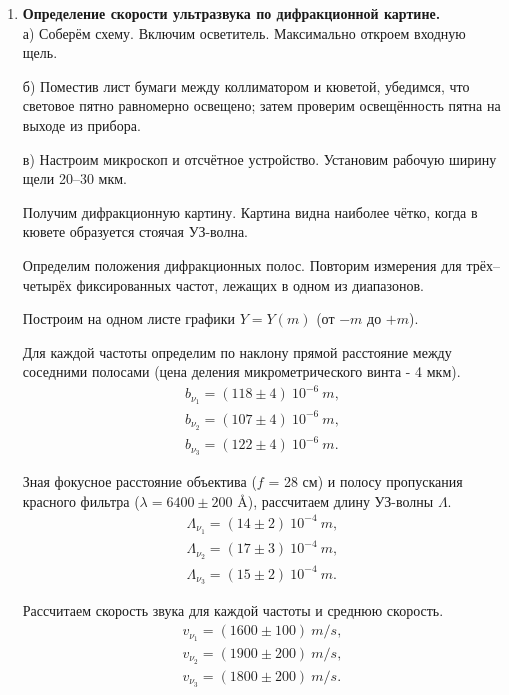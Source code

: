 \begin{enumerate}

    \item 
    
    \textbf{Определение скорости ультразвука по дифракционной картине.}\\
    
    а) Соберём схему. Включим осветитель. Максимально откроем входную щель.

    б) Поместив лист бумаги между коллиматором и кюветой, убедимся, что световое пятно равномерно освещено; затем проверим освещённость пятна на выходе из прибора.
    
    в) Настроим микроскоп и отсчётное устройство. Установим рабочую ширину щели 20–30 мкм.
    
    Получим дифракционную картину. Картина видна наиболее чётко, когда в кювете образуется стоячая УЗ-волна. 
    
    Определим положения дифракционных полос. Повторим измерения для трёх–четырёх фиксированных частот, лежащих в одном из диапазонов. 
    
    Построим на одном листе графики $Y = Y(m)$ (от $−m$ до $+m$). 
    \begin{figure}[h]
    \end{figure}
    
    Для каждой частоты определим по наклону прямой расстояние между соседними полосами (цена деления микрометрического винта - 4 мкм). 
    \begin{gather*}
        b_{\nu_1} = (118 \pm 4)~10^{-6}~m,\\
        b_{\nu_2} = (107 \pm 4)~10^{-6}~m,\\
        b_{\nu_3} = (122 \pm 4)~10^{-6}~m.
    \end{gather*}
    
    Зная фокусное расстояние объектива ($f$ = 28 см) и полосу пропускания красного фильтра ($\lambda = 6400 \pm 200$ \AA), рассчитаем длину УЗ-волны $\Lambda$.
    \begin{gather*}
        \Lambda_{\nu_1} = (14 \pm 2)~10^{-4}~m,\\
        \Lambda_{\nu_2} = (17 \pm 3)~10^{-4}~m,\\
        \Lambda_{\nu_3} = (15 \pm 2)~10^{-4}~m.
    \end{gather*}
    
    Рассчитаем скорость звука для каждой частоты и среднюю скорость.
    \begin{gather*}
        v_{\nu_1} = (1600 \pm 100)~m / s,\\
        v_{\nu_2} = (1900 \pm 200)~m / s,\\
        v_{\nu_3} = (1800 \pm 200)~m / s.
    \end{gather*}
    

\end{enumerate}

